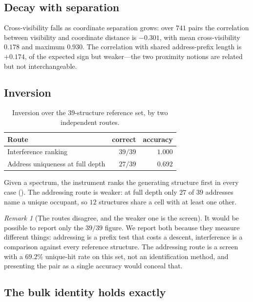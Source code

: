 \documentclass[11pt,twocolumn,a4paper]{article}
\theoremstyle{upthm}
\theoremstyle{definition}
\theoremstyle{remark}
\newtheorem{remark}[theorem]{Remark}
\begin{document}
\subsection{Decay with separation}

Cross-visibility falls as coordinate separation grows: over $741$ pairs
the correlation between visibility and coordinate distance is $-0.301$,
with mean cross-visibility $0.178$ and maximum $0.930$. The correlation
with shared address-prefix length is $+0.174$, of the expected sign but
weaker---the two proximity notions are related but not interchangeable.

\subsection{Inversion}
\label{sec:inversion}

\begin{table}[htbp]
\centering\small
\caption{Inversion over the $39$-structure reference set, by two
independent routes.}
\label{tab:inversion}
\begin{tabular}{@{}lrr@{}}
\toprule
Route & correct & accuracy\\
\midrule
Interference ranking & $39/39$ & $1.000$\\
Address uniqueness at full depth & $27/39$ & $0.692$\\
\bottomrule
\end{tabular}
\end{table}

Given a spectrum, the instrument ranks the generating structure first in
every case (). The addressing route is weaker: at
full depth only $27$ of $39$ addresses name a unique occupant, so $12$
structures share a cell with at least one other.

\begin{remark}[The routes disagree, and the weaker one is the screen]
\label{rem:routes}
It would be possible to report only the $39/39$ figure. We report both
because they measure different things: addressing is a prefix test that
costs a descent, interference is a comparison against every reference
structure. The addressing route is a screen with a $69.2\%$ unique-hit
rate on this set, not an identification method, and presenting the pair
as a single accuracy would conceal that.
\end{remark}

\subsection{The bulk identity holds exactly}
\end{document}
